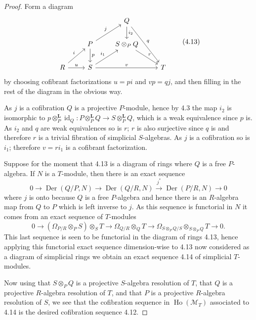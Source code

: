 \documentclass[10pt,reqno]{amsart}
\DeclareMathOperator{\Der}{Der}
\DeclareMathOperator{\Ho}{Ho}
\DeclareMathOperator{\id}{id}
\newcommand{\lra}{\longrightarrow}
\newcommand{\cat}{\mathcal}
\newcommand{\M}{\cat{M}}
\renewcommand{\L}{\mathbf{L}}
\newcommand{\Diff}{\Omega}
\begin{document}
\begin{proof}
Form a diagram
\[
  \begin{tikzcd}
    & & Q\ar[d,"i_2"]\ar[rdd,"q"]\\
    & P\ar[ur,"j"]\ar[d,"p"] & S\otimes_P Q\ar[rd,"r"]\\
    R\ar[ur,"i"]\ar[r,"u"] & S\ar[ur,"i_1"]\ar[rr,"v"] & & T
  \end{tikzcd}
  \tag{4.13}
\]
by choosing cofibrant factorizations $u=pi$ and $vp=qj$, and then filling in the rest of the diagram in the obvious
way.

As $j$ is a cofibration $Q$ is a projective $P$-module, hence by 4.3 the map $i_2$ is isomorphic to
$p\otimes_P^\L\id_Q:P\otimes_P^\L Q\to S\otimes_P^\L Q$, which is a weak equivalence since $p$ is. As $i_2$ and
$q$ are weak equivalences so is $r$; $r$ is also surjective since $q$ is and therefore $r$ is a trivial fibration
of simplicial $S$-algebras. As $j$ is a cofibration so is $i_1$; therefore $v=ri_1$ is a cofibrant factorization.

Suppose for the moment that 4.13 is a diagram of rings where $Q$ is a free $P$-algebra. If $N$ is a $T$-module,
then there is an exact sequence
\[
  0\lra\Der(Q/P,N)\lra\Der(Q/R,N)\xrightarrow{\ j^\ast\ }\Der(P/R,N)\lra 0
\]
where $j$ is onto because $Q$ is a free $P$-algebra and hence there is an $R$-algebra map from $Q$ to $P$ which
is left inverse to $j$. As this sequence is functorial in $N$ it comes from an exact sequence of $T$-modules
\[
  0\lra(\Diff_{P/R}\otimes_P S)\otimes_S T\lra\Diff_{Q/R}\otimes_Q T\lra\Diff_{S\otimes_P Q/S}\otimes_{S\otimes_P Q}T\lra 0.\tag{4.14}
\]
This last sequence is seen to be functorial in the diagram of rings 4.13, hence applying this functorial exact sequence
dimension-wise to 4.13 now considered as a diagram of simplicial rings we obtain an exact sequence 4.14 of simplicial
$T$-modules.

Now using that $S\otimes_P Q$ is a projective $S$-algebra resolution of $T$, that $Q$ is a projective $R$-algebra resolution
of $T$, and that $P$ is a projective $R$-algebra resolution of $S$, we see that the cofibration sequence in $\Ho(\M_T)$
associated to 4.14 is the desired cofibration sequence 4.12.


\end{proof}
\end{document}

